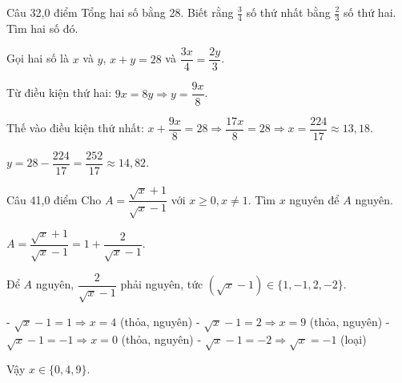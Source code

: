 \begin{de_cau}{Câu 3}{2,0 điểm}
Tổng hai số bằng 28. Biết rằng $\frac{3}{4}$ số thứ nhất bằng $\frac{2}{3}$ số thứ hai.
Tìm hai số đó.
\end{de_cau}

\begin{loi_giai_cau}
Gọi hai số là $x$ và $y$, $x+y=28$ và $\dfrac{3x}{4}=\dfrac{2y}{3}$.

Từ điều kiện thứ hai: $9x=8y\Rightarrow y=\dfrac{9x}{8}$.

Thế vào điều kiện thứ nhất: $x+\dfrac{9x}{8}=28\Rightarrow \dfrac{17x}{8}=28\Rightarrow x=\dfrac{224}{17}\approx 13{,}18$.

$y=28-\dfrac{224}{17}=\dfrac{252}{17}\approx 14{,}82$.
\end{loi_giai_cau}

\begin{de_cau}{Câu 4}{1,0 điểm}
Cho $A = \dfrac{\sqrt{x}+1}{\sqrt{x}-1}$ với $x\geq 0, x\neq 1$. Tìm $x$ nguyên để $A$ nguyên.
\end{de_cau}

\begin{loi_giai_cau}
$A = \dfrac{\sqrt{x}+1}{\sqrt{x}-1} = 1 + \dfrac{2}{\sqrt{x}-1}$.

Để $A$ nguyên, $\dfrac{2}{\sqrt{x}-1}$ phải nguyên, tức $(\sqrt{x}-1)\in\{1,-1,2,-2\}$.

- $\sqrt{x}-1=1\Rightarrow x=4$ (thỏa, nguyên)
- $\sqrt{x}-1=2\Rightarrow x=9$ (thỏa, nguyên)
- $\sqrt{x}-1=-1\Rightarrow x=0$ (thỏa, nguyên)
- $\sqrt{x}-1=-2\Rightarrow \sqrt{x}=-1$ (loại)

Vậy $x\in\{0,4,9\}$.
\end{loi_giai_cau}
